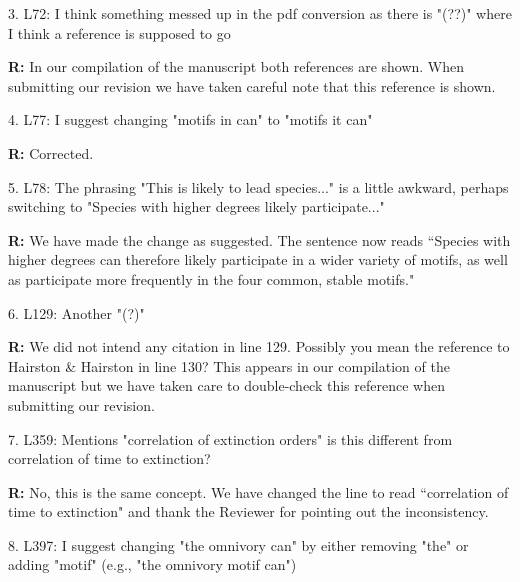 \documentclass[12pt]{article}
\begin{document}
    3. L72: I think something messed up in the pdf conversion as there is "(??)" where I think a reference is supposed to go


    \smallskip

    \textbf{R:} In our compilation of the manuscript both references are shown. When submitting our revision we have taken careful note that this reference is shown.

    \smallskip

    4. L77: I suggest changing "motifs in can" to "motifs it can"

    \smallskip

    \textbf{R:} Corrected.

    \smallskip

    5. L78: The phrasing "This is likely to lead species..." is a little awkward, perhaps switching to "Species with higher degrees likely participate..."

    \smallskip

    \textbf{R:} We have made the change as suggested. The sentence now reads ``Species with higher degrees can therefore likely participate in a wider variety of motifs, as well as participate more frequently in the four common, stable motifs."

    \smallskip

    6. L129: Another "(?)"

    \smallskip

    \textbf{R:} We did not intend any citation in line 129. Possibly you mean the reference to Hairston \& Hairston in line 130? This appears in our compilation of the manuscript but we have taken care to double-check this reference when submitting our revision.%

    \smallskip

    7. L359: Mentions "correlation of extinction orders" is this different from correlation of time to extinction?

    \smallskip

    \textbf{R:} No, this is the same concept. We have changed the line to read ``correlation of time to extinction" and thank the Reviewer for pointing out the inconsistency.

    \smallskip

    8. L397: I suggest changing "the omnivory can" by either removing "the" or adding "motif" (e.g., "the omnivory motif can")
\end{document}
